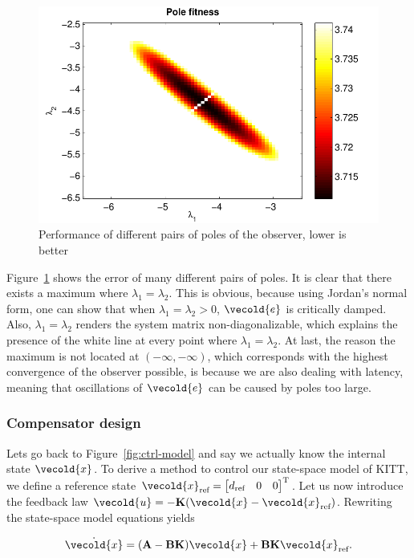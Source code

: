 \documentclass[11pt,titlepage]{report}
\let\vec\vecold
\newcommand{\vec}[1]{\mathbf{#1}}
\begin{document}
\begin{figure}[H]
	\begin{center}
		\includegraphics[width=.7\linewidth]{resource/pole-fitness.pdf}
	\end{center}
	\caption{Performance of different pairs of poles of the observer, lower is better}
	\label{fig:ctrl-poles}
\end{figure}

Figure~\ref{fig:ctrl-poles} shows the error of many different pairs of poles. It is clear that there exists a maximum where $\lambda_1=\lambda_2$. This is obvious, because using Jordan's normal form, one can show that when $\lambda_1 = \lambda_2>0$, 
$\vec{e}$ is critically damped. Also, $\lambda_1 = \lambda_2$ renders the system matrix non-diagonalizable, which explains the presence of the white line at every point where $\lambda_1=\lambda_2$. At last, the reason the maximum is not located at $(-\infty,-\infty)$, which corresponds with the highest convergence of the observer possible, is because we are also dealing with latency, meaning that oscillations of $\vec{e}$ can be caused by poles too large.  

\subsubsection{Compensator design}
Lets go back to Figure~\ref{fig:ctrl-model} and say we actually know the internal state $\vec{x}$. To derive a method to control our state-space model of KITT, we define a reference state $\vec{x}_{\text{ref}} = \tr{\begin{bmatrix*}
	d_{\text{ref}} & 0 & 0 
\end{bmatrix*}}$. Let us now introduce the feedback law $\vec{u} = -\mat{K}(\vec{x}-\vec{x}_{\text{ref}})$. Rewriting the state-space model equations yields

\begin{equation} \label{eq:ctrl-comp}
	\dot{\vec{x}} = (\mat{A} - \mat{B} \mat{K}) \vec{x} + \mat{B} \mat{K} \vec{x}_{\text{ref}}.
\end{equation}
\end{document}
